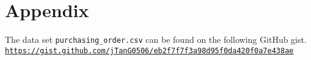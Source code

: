 \section{Appendix}

The data set \lstinline|purchasing_order.csv| can be found on the following GitHub gist. \\
\href{https://gist.github.com/jTanG0506/eb2f7f7f3a98d95f0da420f0a7e438ae}{\lstinline|https://gist.github.com/jTanG0506/eb2f7f7f3a98d95f0da420f0a7e438ae|}




\newpage


\newpage

